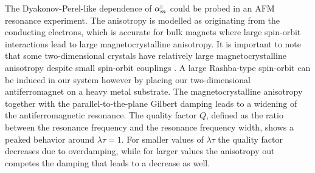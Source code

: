 The Dyakonov-Perel-like dependence of $\alpha_m^{\scriptscriptstyle\parallel}$ could be probed in an AFM resonance experiment. The anisotropy is modelled as originating from the conducting electrons, which is accurate for bulk magnets where large spin-orbit interactions lead to large magnetocrystalline anisotropy. It is important to note that some two-dimensional crystals  have relatively large magnetocrystalline anisotropy despite small spin-orbit couplings \cite{dieny_perpendicular_2017}. A large Rashba-type spin-orbit can be induced in our system however by placing our two-dimensional antiferromagnet on a heavy metal substrate. The magnetocrystalline anisotropy together with the parallel-to-the-plane Gilbert damping  leads to a widening of the antiferromagnetic resonance. The quality factor $Q$, defined as the ratio between the resonance frequency and the resonance frequency width, shows a peaked behavior around $\lambda\tau=1$. For smaller values of $\lambda\tau$ the quality factor decreases due to overdamping, while for larger values the anisotropy out competes the damping that leads to a decrease as well.

